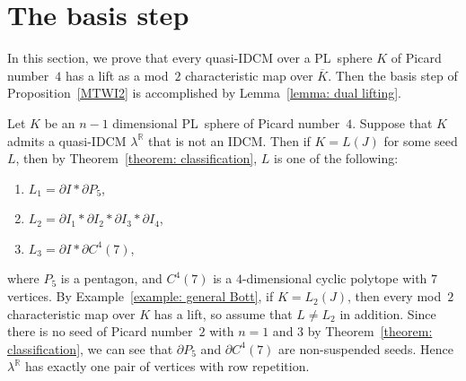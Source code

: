 \documentclass[11pt]{amsart}
\theoremstyle{plain}
\numberwithin{equation}{section}
\theoremstyle{definition}
\newcommand{\R}{\mathbb{R}}
\begin{document}
\section{The basis step} \label{section: basis step 1}
In this section, we prove that every quasi-IDCM over a PL~sphere $K$ of Picard number~$4$ has a lift as a mod~$2$ characteristic map over $\overline{K}$.
Then the basis step of Proposition~\ref{MTWI2} is accomplished by Lemma~\ref{lemma: dual lifting}.

Let $K$ be an $n-1$ dimensional PL~sphere of Picard number~$4$.
Suppose that $K$ admits a quasi-IDCM $\lambda^\R$ that is not an IDCM.
Then if $K = L(J)$ for some seed $L$, then by Theorem~\ref{theorem: classification}, $L$ is one of the following: \begin{enumerate}
                                                                          \item $L_1 = \partial I \ast \partial P_5$,
                                                                          \item $L_2 = \partial I_1 \ast \partial I_2 \ast \partial I_3 \ast \partial I_4$,
                                                                          \item $L_3 = \partial I \ast \partial C^4(7)$,
                                                                        \end{enumerate}
where $P_5$ is a pentagon, and $C^4(7)$ is a $4$-dimensional cyclic polytope with $7$ vertices.
By Example~\ref{example: general Bott}, if $K = L_2(J)$, then every mod~$2$ characteristic map over $K$ has a lift, so assume that $L \not= L_2$ in addition.
Since there is no seed of Picard number~$2$ with $n=1$ and $3$ by Theorem~\ref{theorem: classification}, we can see that $\partial P_5$ and $\partial C^4(7)$ are non-suspended seeds.
Hence $\lambda^\R$ has exactly one pair of vertices with row repetition.
\end{document}
